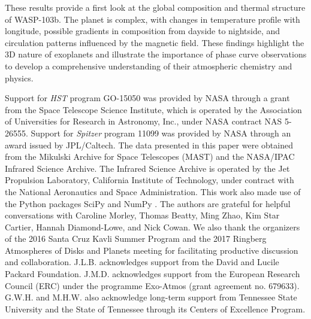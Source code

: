 \documentclass[twocolumn, trackchanges]{aastex61}
\begin{document}
These results provide a first look at the global composition and thermal structure of WASP-103b.  The planet is complex, with changes in temperature profile with longitude, possible gradients in composition from dayside to nightside, and circulation patterns influenced by the magnetic field. These findings highlight the 3D nature of exoplanets and illustrate the importance of phase curve observations to develop a comprehensive understanding of their atmospheric chemistry and physics.




\acknowledgments
Support for \textit{HST} program GO-15050 was provided by NASA through a grant from the Space Telescope Science Institute, which is operated by the Association of Universities for Research in Astronomy, Inc., under NASA contract NAS 5-26555. Support for \textit{Spitzer} program 11099 was provided by NASA through an award issued by JPL/Caltech.  The data presented in this paper were obtained from the Mikulski Archive for Space Telescopes (MAST) and the NASA/IPAC Infrared Science Archive. The Infrared Science Archive is operated by the Jet Propulsion Laboratory, California Institute of Technology, under contract with the National Aeronautics and Space Administration.  This work also made use of the Python packages  SciPy and NumPy \citep{jones_scipy_2001, van2011numpy}. The authors are grateful for helpful conversations with Caroline Morley, Thomas Beatty, Ming Zhao, Kim Star Cartier, Hannah Diamond-Lowe, and Nick Cowan. We also thank the organizers of the 2016 Santa Cruz Kavli Summer Program and the 2017 Ringberg Atmospheres of Disks and Planets meeting for facilitating productive discussion and collaboration.  J.L.B. acknowledges support from the David and Lucile Packard Foundation.  J.M.D. acknowledges support from the European Research Council (ERC) under the programme Exo-Atmos (grant agreement no. 679633). G.W.H. and M.H.W. also acknowledge long-term support from Tennessee State University and the State of Tennessee through its Centers of Excellence Program.



\end{document}
